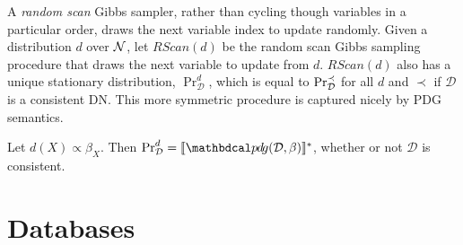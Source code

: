 \documentclass{article}
\begin{document}
\begin{wip}
	A \emph{random scan} Gibbs sampler, rather than cycling though variables in a 
	particular order, draws the next variable index to update randomly.
	Given a distribution $d$ over $\mathcal N$,
	let $\mathit{RScan}(d)$ be the random scan Gibbs sampling procedure that draws
	the next variable to update from $d$. $\mathit{RScan}(d)$ also has a
	unique stationary distribution, $\Pr_{\mathcal D}^d$, which is equal
	to $\Pr_{\cal D}^{\prec}$ for all $d$ and $\prec$ if $\mathcal D$ is a
	consistent DN. This more symmetric procedure is captured nicely by PDG
	semantics. 
	
	\begin{conj}\label{thm:dns-are-completely-pdgs}
		Let $d(X) \propto \beta_X$. Then
		$\Pr_{\mathcal D}^d = \bbr{\PDGof{\mathcal D, \beta}}^*$, whether or not $\mathcal D$ is consistent.
	\end{conj}
	
\end{wip}




	\section{Databases}
\end{document}
